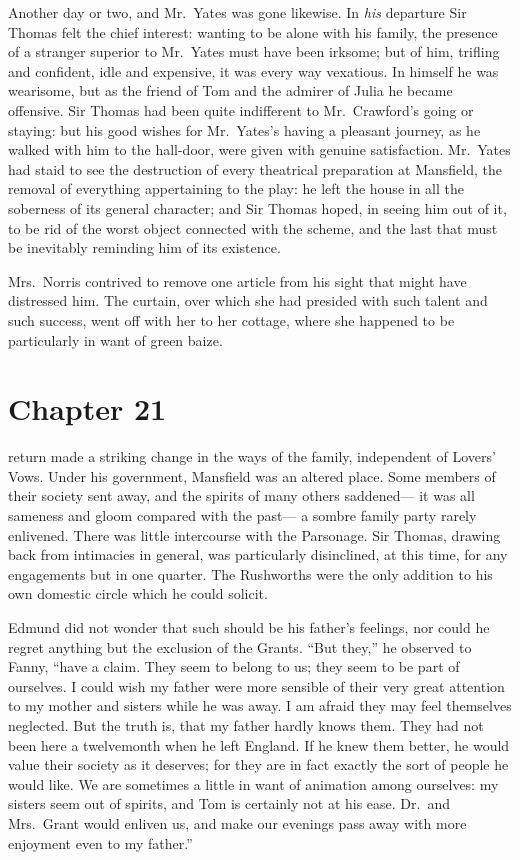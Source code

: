 Another day or two, and Mr.\ Yates was gone likewise.
In \emph{his} departure Sir Thomas felt the chief interest:
wanting to be alone with his family, the presence of a
stranger superior to Mr.\ Yates must have been irksome;
but of him, trifling and confident, idle and expensive,
it was every way vexatious.  In himself he was wearisome,
but as the friend of Tom and the admirer of Julia he
became offensive.  Sir Thomas had been quite indifferent
to Mr.\ Crawford's going or staying:  but his good
wishes for Mr.\ Yates's having a pleasant journey,
as he walked with him to the hall-door, were given with
genuine satisfaction.  Mr.\ Yates had staid to see the
destruction of every theatrical preparation at Mansfield,
the removal of everything appertaining to the play:
he left the house in all the soberness of its general
character; and Sir Thomas hoped, in seeing him out of it,
to be rid of the worst object connected with the scheme,
and the last that must be inevitably reminding him of
its existence.

Mrs.\ Norris contrived to remove one article from his sight
that might have distressed him.  The curtain, over which
she had presided with such talent and such success,
went off with her to her cottage, where she happened
to be particularly in want of green baize.



\chapter{Chapter 21}

 return made a striking change in the ways of
the family, independent of Lovers' Vows.  Under his government,
Mansfield was an altered place.  Some members of their
society sent away, and the spirits of many others saddened---%
it was all sameness and gloom compared with the past---%
a sombre family party rarely enlivened.  There was little
intercourse with the Parsonage.  Sir Thomas, drawing back
from intimacies in general, was particularly disinclined,
at this time, for any engagements but in one quarter.
The Rushworths were the only addition to his own domestic
circle which he could solicit.

Edmund did not wonder that such should be his father's feelings,
nor could he regret anything but the exclusion of the Grants.
``But they,'' he observed to Fanny, ``have a claim.  They seem
to belong to us; they seem to be part of ourselves.
I could wish my father were more sensible of their very
great attention to my mother and sisters while he was away.
I am afraid they may feel themselves neglected.
But the truth is, that my father hardly knows them.
They had not been here a twelvemonth when he left England.
If he knew them better, he would value their society
as it deserves; for they are in fact exactly the sort
of people he would like.  We are sometimes a little
in want of animation among ourselves:  my sisters seem
out of spirits, and Tom is certainly not at his ease.
Dr.\ and Mrs.\ Grant would enliven us, and make our evenings
pass away with more enjoyment even to my father.''


